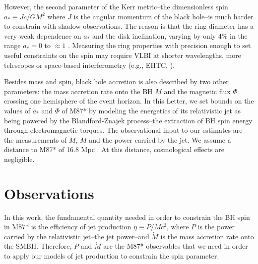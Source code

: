 \documentclass[twocolumn, linenumbers]{aastex62} %
\begin{document}
However, the second parameter of the Kerr metric--the dimensionless spin $a_* \equiv Jc/GM^2$ where $J$ is the angular momentum of the black hole--is much harder to constrain with shadow observations. The reason is that the ring diameter has a very weak dependence on $a_*$ and the disk inclination, varying by only 4\% in the range $a_*=0$ to $\approx 1$ \citep{Takahashi2004,Johannsen2010}. Measuring the ring properties with precision enough to set useful constraints on the spin may require VLBI at shorter wavelengths, more telescopes or space-based interferometry (e.g., EHTC, \citealt{Roelofs2019}).

Besides mass and spin, black hole accretion is also described by two other parameters: the mass accretion rate onto the BH $\dot{M}$ and the magnetic flux $\Phi$ crossing one hemisphere of the event horizon. In this Letter, we set bounds on the values of $a_*$ and $\Phi$ of M87* by modeling the energetics of its relativistic jet as being powered by the Blandford-Znajek process--the extraction of BH spin energy through electromagnetic torques. The observational input to our estimates are the measurements of $M$, $\dot{M}$ and the power carried by the jet. We assume a distance to M87* of 16.8 Mpc . At this distance, cosmological effects are negligible. 




\section{Observations} \label{sec:obs}

In this work, the fundamental quantity needed in order to constrain the BH spin in M87* is the efficiency of jet production $\eta \equiv P/ \dot{M} c^2$, where $P$ is the power carried by the relativistic jet--the jet power--and $\dot{M}$ is the mass accretion rate onto the SMBH. Therefore, $P$ and $\dot{M}$ are the M87* observables that we need in order to apply our models of jet production to constrain the spin parameter.
\end{document}
